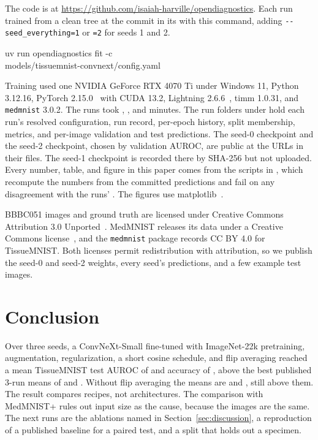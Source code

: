 \documentclass[conference]{IEEEtran}
\newif\ifanycitation
\let\citeAnyKey\cite
\renewcommand{\cite}{\global\anycitationtrue\citeAnyKey}
\begin{document}
The code is at \url{https://github.com/isaiah-harville/opendiagnostics}. Each run trained
from a clean tree at the commit in its  with this command, adding
\texttt{-{}-seed\_everything=1} or \texttt{=2} for seeds 1 and 2.
\begin{flushleft}\footnotesize\ttfamily
uv run opendiagnostics fit -c\\
\quad models/tissuemnist-convnext/config.yaml
\end{flushleft} Training used one
NVIDIA GeForce RTX 4070 Ti under Windows 11, Python 3.12.16, PyTorch
2.15.0~\cite{paszke2019pytorch} with CUDA 13.2, Lightning 2.6.6~\cite{falcon2020lightning},
timm 1.0.31, and \texttt{medmnist} 3.0.2. The runs took \runMinutesSeedZero{},
\runMinutesSeedOne{}, and \runMinutesSeedTwo{} minutes. The run folders under
 hold each run's resolved configuration, run
record, per-epoch history, split membership, metrics, and per-image validation and test
predictions. The seed-0 checkpoint and the seed-2 checkpoint, chosen by validation AUROC, are public
at the URLs in their  files. The seed-1 checkpoint is recorded there by
SHA-256 but not uploaded. Every
number, table, and figure in this paper comes from the scripts in
, which recompute the numbers from the committed predictions and
fail on any disagreement with the runs' . The figures use
matplotlib~\cite{hunter2007matplotlib}.

BBBC051 images and ground truth are licensed under Creative Commons Attribution 3.0
Unported~\cite{broad2021bbbc051}. MedMNIST releases its data under a Creative Commons
license~\cite{yang2023medmnistv2}, and the \texttt{medmnist} package records CC BY 4.0 for
TissueMNIST. Both licenses permit redistribution with attribution, so we publish the
seed-0 and seed-2 weights, every seed's predictions, and a few example test images.

\section{Conclusion}

Over three seeds, a ConvNeXt-Small fine-tuned with ImageNet-22k pretraining, augmentation,
regularization, a short cosine schedule, and flip averaging reached a mean TissueMNIST test
AUROC of \testAurocMean{} and accuracy of \testAccMean{}, above the best published 3-run
means of \baseBestAuroc{} and \baseBestAcc{}. Without flip averaging the means are
\testNoFlipAurocMean{} and \testNoFlipAccMean{}, still above them. The result compares
recipes, not architectures. The comparison with MedMNIST+ rules out input size as the
cause, because the images are the same. The next runs are the ablations named in Section~\ref{sec:discussion}, a reproduction of a published baseline
for a paired test, and a split that holds out a specimen.
\end{document}
